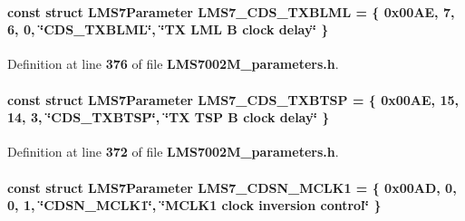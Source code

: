 \paragraph[{L\+M\+S7\+\_\+\+C\+D\+S\+\_\+\+T\+X\+B\+L\+ML}]{\setlength{\rightskip}{0pt plus 5cm}const struct {\bf L\+M\+S7\+Parameter} L\+M\+S7\+\_\+\+C\+D\+S\+\_\+\+T\+X\+B\+L\+ML = \{ 0x00\+A\+E, 7, 6, 0, \char`\"{}\+C\+D\+S\+\_\+\+T\+X\+B\+L\+M\+L\char`\"{}, \char`\"{}\+T\+X L\+M\+L B clock delay\char`\"{} \}\hspace{0.3cm}{\ttfamily [static]}}\label{LMS7002M__parameters_8h_ae3dc561ffdf9d3bba191358349a72aee}


Definition at line {\bf 376} of file {\bf L\+M\+S7002\+M\+\_\+parameters.\+h}.

\paragraph[{L\+M\+S7\+\_\+\+C\+D\+S\+\_\+\+T\+X\+B\+T\+SP}]{\setlength{\rightskip}{0pt plus 5cm}const struct {\bf L\+M\+S7\+Parameter} L\+M\+S7\+\_\+\+C\+D\+S\+\_\+\+T\+X\+B\+T\+SP = \{ 0x00\+A\+E, 15, 14, 3, \char`\"{}\+C\+D\+S\+\_\+\+T\+X\+B\+T\+S\+P\char`\"{}, \char`\"{}\+T\+X T\+S\+P B clock delay\char`\"{} \}\hspace{0.3cm}{\ttfamily [static]}}\label{LMS7002M__parameters_8h_a8d014eb6db81bed655b1b31ea935c981}


Definition at line {\bf 372} of file {\bf L\+M\+S7002\+M\+\_\+parameters.\+h}.

\paragraph[{L\+M\+S7\+\_\+\+C\+D\+S\+N\+\_\+\+M\+C\+L\+K1}]{\setlength{\rightskip}{0pt plus 5cm}const struct {\bf L\+M\+S7\+Parameter} L\+M\+S7\+\_\+\+C\+D\+S\+N\+\_\+\+M\+C\+L\+K1 = \{ 0x00\+A\+D, 0, 0, 1, \char`\"{}\+C\+D\+S\+N\+\_\+\+M\+C\+L\+K1\char`\"{}, \char`\"{}\+M\+C\+L\+K1 clock inversion control\char`\"{} \}\hspace{0.3cm}{\ttfamily [static]}}\label{LMS7002M__parameters_8h_a53a35ec25516fa4ac4fa797bad7b590e}


